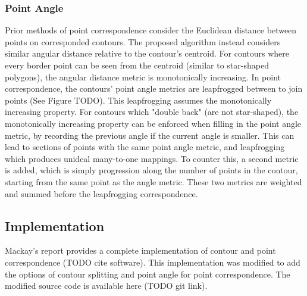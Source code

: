 \documentclass[11p, titlepage]{article}
\begin{document}
\subsubsection{Point Angle}

Prior methods of point correspondence consider the Euclidean distance between points on corresponded contours. The proposed algorithm instead considers similar angular distance relative to the contour's centroid. For contours where every border point can be seen from the centroid (similar to star-shaped polygons), the angular distance metric is monotonically increasing. In point correspondence, the contours' point angle metrics are leapfrogged between to join points (See Figure TODO). This leapfrogging assumes the monotonically increasing property. For contours which "double back" (are not star-shaped), the monotonically increasing property can be enforced when filling in the point angle metric, by recording the previous angle if the current angle is smaller. This can lead to sections of points with the same point angle metric, and leapfrogging which produces unideal many-to-one mappings. To counter this, a second metric is added, which is simply progression along the number of points in the contour, starting from the same point as the angle metric. These two metrics are weighted and summed before the leapfrogging correspondence.

\subsection{Implementation}

Mackay's report provides a complete implementation of contour and point correspondence (TODO cite software). This implementation was modified to add the options of contour splitting and point angle for point correspondence. The modified source code is available here (TODO git link).
\end{document}
